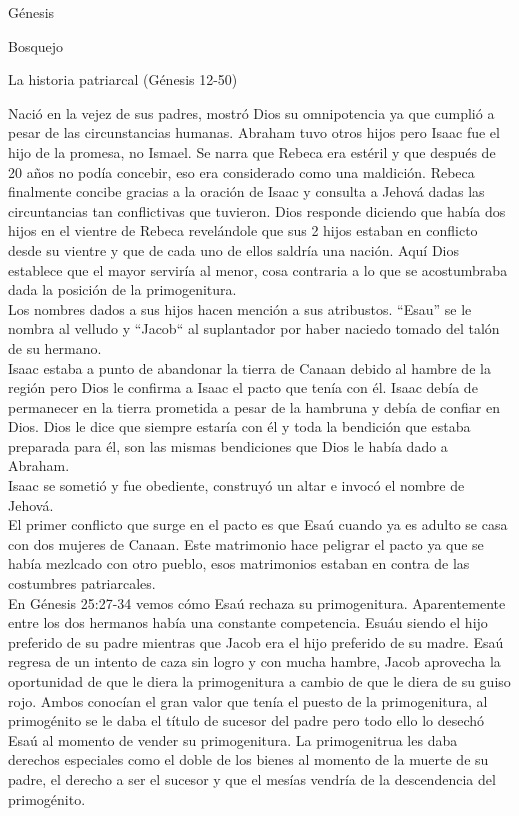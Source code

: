 \begin{section}{Génesis}
\begin{subsection}{Bosquejo}
\begin{subsubsection}{La historia patriarcal (Génesis 12-50)}
\begin{enumerate}
	Nació en la vejez de sus padres, mostró Dios su omnipotencia ya que cumplió a pesar de las circunstancias humanas. Abraham tuvo otros hijos pero Isaac fue el hijo de la promesa, no Ismael. Se narra que Rebeca era estéril y que después de 20 años no podía concebir, eso era considerado como una maldición. Rebeca finalmente concibe gracias a la oración de Isaac y consulta a Jehová dadas las circuntancias tan conflictivas que tuvieron. Dios responde diciendo que había dos hijos en el vientre de Rebeca revelándole que sus 2 hijos estaban en conflicto desde su vientre y que de cada uno de ellos saldría una nación. Aquí Dios establece que el mayor serviría al menor, cosa contraria a lo que se acostumbraba dada la posición de la primogenitura.\\
	Los nombres dados a sus hijos hacen mención a sus atribustos. ``Esau'' se le nombra al velludo y  ``Jacob`` al suplantador por haber naciedo tomado del talón de su hermano.\\
	Isaac estaba a punto de abandonar la tierra de Canaan debido al hambre de la región pero Dios le confirma a Isaac el pacto que tenía con él. Isaac debía de permanecer en la tierra prometida a pesar de la hambruna y debía de confiar en Dios. Dios le dice que siempre estaría con él y toda la bendición que estaba preparada para él, son las mismas bendiciones que Dios le había dado a Abraham.\\
	Isaac se sometió y fue obediente, construyó un altar e invocó el nombre de Jehová.\\
	El primer conflicto que surge en el pacto es que Esaú cuando ya es adulto se casa con dos mujeres de Canaan. Este matrimonio hace peligrar el pacto ya que se había mezlcado con otro pueblo, esos matrimonios estaban en contra de las costumbres patriarcales.\\
	En Génesis 25:27-34 vemos cómo Esaú rechaza su primogenitura. Aparentemente entre los dos hermanos había una constante competencia. Esuáu siendo el hijo preferido de su padre mientras que Jacob era el hijo preferido de su madre.\newpage
	Esaú regresa de un intento de caza sin logro y con mucha hambre, Jacob aprovecha la oportunidad de que le diera la primogenitura a cambio de que le diera de su guiso rojo. Ambos conocían el gran valor que tenía el puesto de la primogenitura, al primogénito se le daba el título de sucesor del padre pero todo ello lo desechó Esaú al momento de vender su primogenitura. La primogenitrua les daba derechos especiales como el doble de los bienes al momento de la muerte de su padre, el derecho a ser el sucesor y que el mesías vendría de la descendencia del primogénito.\\

\end{enumerate}
\end{subsubsection}
\end{subsection}
\end{section}
